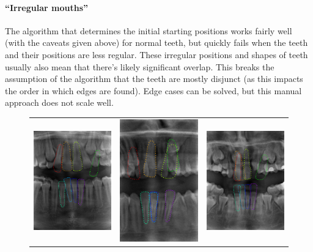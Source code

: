 \documentclass[a4paper,10pt]{article}
\begin{document}
\paragraph{``Irregular mouths''} The algorithm that determines the initial starting positions works fairly well (with the caveats given above) for normal teeth, but quickly fails when the teeth and their positions are less regular. These irregular positions and shapes of teeth usually also mean that there's likely significant overlap. This breaks the assumption of the algorithm that the teeth are mostly disjunct (as this impacts the order in which edges are found). Edge cases can be solved, but this manual approach does not scale well.

\begin{figure}[!h]
\begin{tabular}{ccc}
\includegraphics[width=50mm]{tooth_result_13.png} & \includegraphics[width=50mm]{tooth_result_22.png} & \includegraphics[width=50mm]{tooth_result_16.png}\\
 

\end{tabular}
\end{figure}
\end{document}
